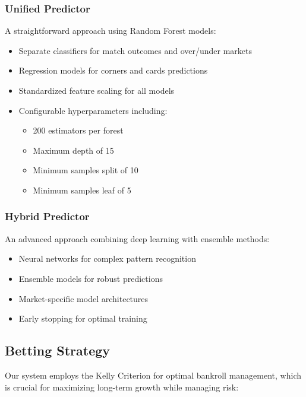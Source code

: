 \documentclass[conference]{IEEEtran}
\begin{document}
\subsubsection{Unified Predictor}
A straightforward approach using Random Forest models:
\begin{itemize}
\item Separate classifiers for match outcomes and over/under markets
\item Regression models for corners and cards predictions
\item Standardized feature scaling for all models
\item Configurable hyperparameters including:
    \begin{itemize}
    \item 200 estimators per forest
    \item Maximum depth of 15
    \item Minimum samples split of 10
    \item Minimum samples leaf of 5
    \end{itemize}
\end{itemize}

\subsubsection{Hybrid Predictor}
An advanced approach combining deep learning with ensemble methods:
\begin{itemize}
\item Neural networks for complex pattern recognition
\item Ensemble models for robust predictions
\item Market-specific model architectures
\item Early stopping for optimal training
\end{itemize}

\subsection{Betting Strategy}
Our system employs the Kelly Criterion for optimal bankroll management, which is crucial for maximizing long-term growth while managing risk:
\end{document}

